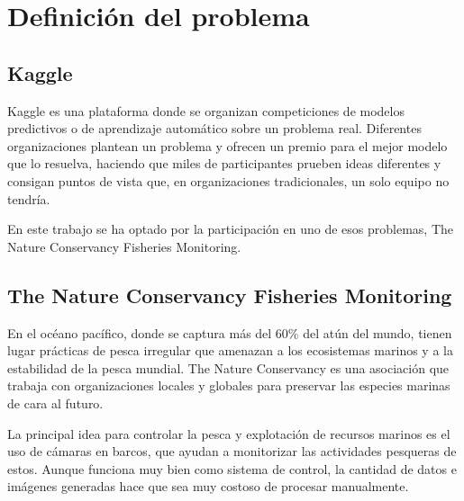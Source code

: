 
\chapter{Definición del problema}

\label{Chapter5} %


\section{Kaggle}

Kaggle es una plataforma donde se organizan competiciones de modelos predictivos o de aprendizaje automático sobre un problema real. Diferentes organizaciones plantean un problema y ofrecen un premio para el mejor modelo que lo resuelva, haciendo que miles de participantes prueben ideas diferentes y consigan puntos de vista que, en organizaciones tradicionales, un solo equipo no tendría.

En este trabajo se ha optado por la participación en uno de esos problemas, The Nature Conservancy Fisheries Monitoring.

\section{The Nature Conservancy Fisheries Monitoring}

En el océano pacífico, donde se captura más del 60\% del atún del mundo, tienen lugar prácticas de pesca irregular que amenazan a los ecosistemas marinos y a la estabilidad de la pesca mundial. The Nature Conservancy es una asociación que trabaja con organizaciones locales y globales para preservar las especies marinas de cara al futuro.

La principal idea para controlar la pesca y explotación de recursos marinos es el uso de cámaras en barcos, que ayudan a monitorizar las actividades pesqueras de estos. Aunque funciona muy bien como sistema de control, la cantidad de datos e imágenes generadas hace que sea muy costoso de procesar manualmente.

\begin{center}
\end{center}

